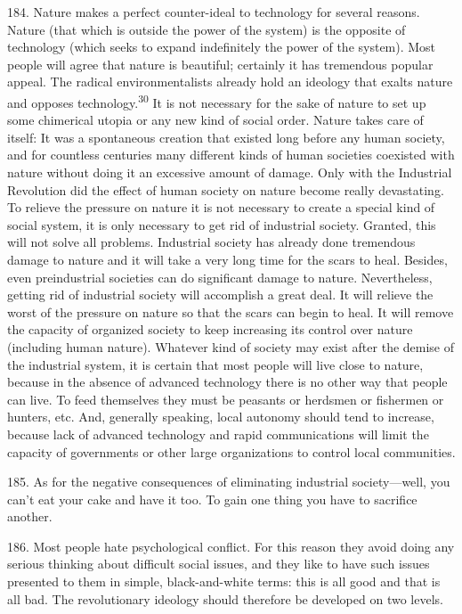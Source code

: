 \documentclass{article}
\begin{document}
184. Nature makes a perfect counter-ideal to technology for several reasons. Nature (that which 
is outside the power of the system) is the opposite of technology (which seeks to expand 
indefinitely the power of the system). Most people will agree that nature is beautiful; certainly it 
has tremendous popular appeal. The radical environmentalists already hold an ideology that exalts 
nature and opposes technology.\textsuperscript{30} It is not necessary for the sake of nature to set up some chimerical 
utopia or any new kind of social order. Nature takes care of itself: It was a spontaneous creation 
that existed long before any human society, and for countless centuries many different kinds of 
human societies coexisted with nature without doing it an excessive amount of damage. Only with 
the Industrial Revolution did the effect of human society on nature become really devastating. To 
relieve the pressure on nature it is not necessary to create a special kind of social system, it is only 
necessary to get rid of industrial society. Granted, this will not solve all problems. Industrial 
society has already done tremendous damage to nature and it will take a very long time for the 
scars to heal. Besides, even preindustrial societies can do significant damage to 
nature. Nevertheless, getting rid of industrial society will accomplish a great deal. It will relieve
the worst of the pressure on nature so that the scars can begin to heal. It will remove the capacity 
of organized society to keep increasing its control over nature (including human nature). Whatever 
kind of society may exist after the demise of the industrial system, it is certain that most people 
will live close to nature, because in the absence of advanced technology there is no other way that 
people can live. To feed themselves they must be peasants or herdsmen or fishermen or hunters, 
etc. And, generally speaking, local autonomy should tend to increase, because lack of advanced 
technology and rapid communications will limit the capacity of governments or other large 
organizations to control local communities. \vspace{\baselineskip}

185. As for the negative consequences of eliminating industrial society—well, you can’t eat your 
cake and have it too. To gain one thing you have to sacrifice another. \vspace{\baselineskip}

186. Most people hate psychological conflict. For this reason they avoid doing any serious 
thinking about difficult social issues, and they like to have such issues presented to them in simple, 
black-and-white terms: this is all good and that is all bad. The revolutionary ideology should 
therefore be developed on two levels. \vspace{\baselineskip}
\end{document}
